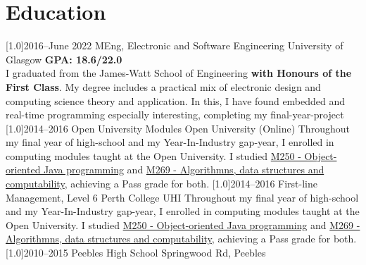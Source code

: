 \documentclass[]{cv-style}     %
\begin{document}
\section{Education}
  \vspace{-0.2cm}
\begin{entrylist}
\entry
{\scalebox{.8}[1.0]{2016--June 2022}}
{MEng, Electronic and Software Engineering}
{University of Glasgow}
{\textbf{GPA: 18.6/22.0}\\
\small{I graduated from the James-Watt School of Engineering \textbf{with Honours of the First Class}. My degree includes a practical mix of electronic design and computing science theory and application. In this, I have found embedded and real-time programming especially interesting, completing my final-year-project }}
\entry
{\scalebox{.8}[1.0]{2014--2016}}
{Open University Modules}
{Open University (Online)}
{\small{Throughout my final year of high-school and my Year-In-Industry gap-year, I enrolled in computing modules taught at the Open University. I studied \href{https://www.open.ac.uk/courses/modules/m250}{M250 - Object-oriented Java programming} and \href{https://www.open.ac.uk/courses/modules/m269}{M269 - Algorithmns, data structures and computability}, achieving a Pass grade for both.}}
\entry
{\scalebox{.8}[1.0]{2014--2016}}
{First-line Management, Level 6}
{Perth College UHI}
{\small{Throughout my final year of high-school and my Year-In-Industry gap-year, I enrolled in computing modules taught at the Open University. I studied \href{https://www.open.ac.uk/courses/modules/m250}{M250 - Object-oriented Java programming} and \href{https://www.open.ac.uk/courses/modules/m269}{M269 - Algorithmns, data structures and computability}, achieving a Pass grade for both.}}
\entry
{\scalebox{.8}[1.0]{2010--2015}}
{Peebles High School}
{Springwood Rd, Peebles}


\end{entrylist}
\end{document}
